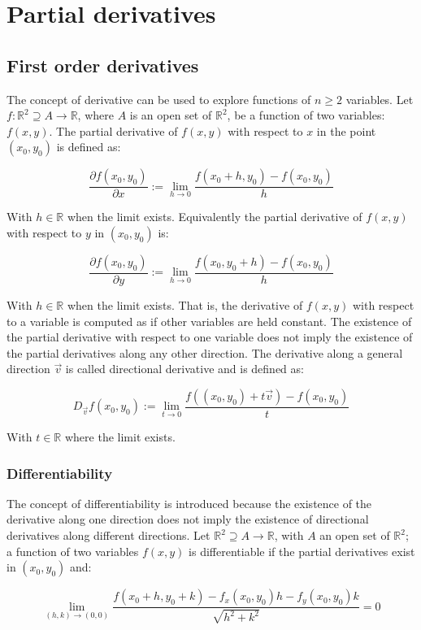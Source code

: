 \chapter{Partial derivatives}

\section{First order derivatives}
The concept of derivative can be used to explore functions of $n\ge 2$ variables.
Let $f:\mathbb{R}^2\supseteq A\rightarrow \mathbb{R}$, where $A$ is an open set of $\mathbb{R}^2$, be a function of two variables: $f(x, y)$.
The partial derivative of $f(x,y)$ with respect to $x$ in the point $(x_0, y_0)$ is defined as:

$$\frac{\partial f(x_0, y_0)}{\partial x} := \lim\limits_{h\rightarrow 0}\frac{f(x_0+h, y_0) -f(x_0, y_0)}{h}$$

With $h\in\mathbb{R}$ when the limit exists.
Equivalently the partial derivative of $f(x, y)$ with respect to $y$ in $(x_0, y_0)$ is:

$$\frac{\partial f(x_0, y_0)}{\partial y} := \lim\limits_{h\rightarrow 0}\frac{f(x_0, y_0+h) -f(x_0, y_0)}{h}$$

With $h\in\mathbb{R}$ when the limit exists.
That is, the derivative of $f(x,y)$ with respect to a variable is computed as if other variables are held constant.
The existence of the partial derivative with respect to one variable does not imply the existence of the partial derivatives along any other direction.
The derivative along a general direction $\vec{v}$ is called directional derivative and is defined as:

$$D_{\vec{v}}f(x_0, y_0) := \lim\limits_{t\rightarrow 0}\frac{f((x_0, y_0) + t\vec{v}) - f(x_0, y_0)}{t}$$

With $t\in\mathbb{R}$ where the limit exists.

	\subsection{Differentiability}
	The concept of differentiability is introduced because the existence of the derivative along one direction does not imply the existence of directional derivatives along different directions.
	Let $\mathbb{R}^2\supseteq A\rightarrow\mathbb{R}$, with $A$ an open set of $\mathbb{R}^2$; a function of two variables $f(x,y)$ is differentiable if the partial derivatives exist in $(x_0, y_0)$ and:

	$$\lim\limits_{(h,k)\rightarrow(0,0)}\frac{f(x_0+h, y_0+k) - f_x(x_0, y_0)h - f_y(x_0, y_0)k}{\sqrt{h^2+k^2}} = 0$$

